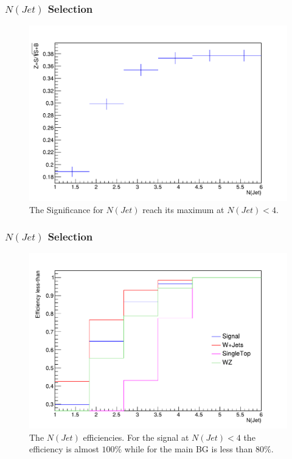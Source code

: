 \documentclass{beamer}
\begin{document}
\begin{frame}
\frametitle{$N(Jet)$ Selection}
\begin{figure}[!h]
	
	\centering
	\includegraphics[scale=0.45]{pictures/Selection/NJet/Sig-NJet}
	\caption{{\scriptsize The Significance for $N(Jet)$ reach its maximum at $N(Jet)< 4$.}}
	\label{Sig-NJet}
	
\end{figure}


\end{frame}



\begin{frame}
\frametitle{$N(Jet)$ Selection}
\begin{figure}[!h]

\centering
\includegraphics[scale=0.45]{pictures/Selection/NJet/Eff-NJet}
\caption{{\scriptsize The $N(Jet)$ efficiencies. For the signal at  $N(Jet)< 4$ the efficiency is almost $100\%$ while for the main BG is less than $80\%$.}}
\label{Eff-NJet}

\end{figure}


\end{frame}
\end{document}
